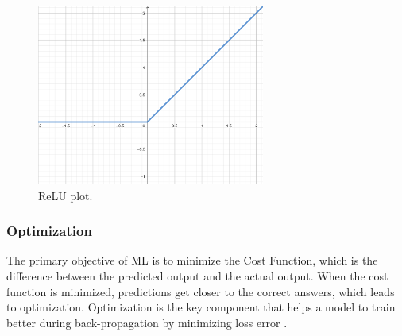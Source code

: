 \documentclass[12pt]{diazessay}
\newcounter{subsubsubsection}[subsubsection]
\begin{document}
    \begin{figure}[H]
        \centering
        \includegraphics[width=7.5cm]{Figures/relu2.png}
        \caption[Rectified Linear Units function plot]{ReLU plot.}
        \label{fig:relu}
    \end{figure}
    
    
    
    \subsubsection{Optimization}
    \hspace{0.7cm} The primary objective of ML is to minimize the Cost Function, which is the difference between the predicted output and the actual output. When the cost function is minimized, predictions get closer to the correct answers, which leads to optimization. Optimization is the key component that helps a model to train better during back-propagation by minimizing loss error \cite{gnanasekaran2022ground}. 
    
\end{document}
